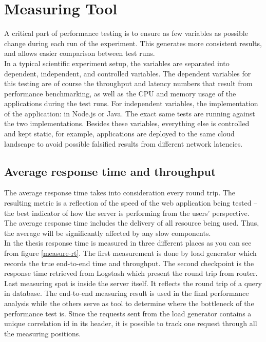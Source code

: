 \chapter{Measuring Tool}
A critical part of performance testing is to ensure as few variables as possible change during each run of the experiment. This generates more consistent results, and allows easier comparison between test runs.\\
In a typical scientific experiment setup, the variables are separated into dependent, independent, and controlled variables. The dependent variables for this testing are of course the throughput and latency numbers that result from performance benchmarking, as well as the CPU and memory usage of the applications during the test runs. For independent variables, the implementation of the application: in Node.js or Java. The exact same tests are running against the two implementations. Besides these variables, everything else is controlled and kept static, for example, applications are deployed to the same cloud landscape to avoid possible falsified  results from different network latencies. \\


\section{Average response time and throughput}
The average response time takes into consideration every round trip. The resulting metric is a reflection of the speed of the web application being tested – the best indicator of how the server is performing from the users’ perspective. The average response time includes the delivery of all resource being used. Thus, the average will be significantly affected by any slow components.\\
In the thesis response time is measured in three different places as you can see from figure \ref{measure-rt}. The first measurement is done by load generator which records the true end-to-end time and throughput. The second checkpoint is the response time retrieved from Logstash which present the round trip from router. Last measuring spot is inside the server itself. It reflects the round trip of a query in database. The end-to-end measuring result is used in the final performance analysis while the others serve as tool to determine where the bottleneck of the performance test is. Since the requests sent from the load generator contains a unique correlation id in its header, it is possible to track one request through all the measuring positions. \\

